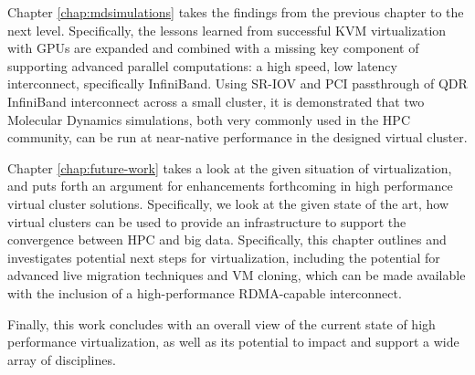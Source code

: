 Chapter \ref{chap:mdsimulations} takes the findings from the previous chapter to the next level. Specifically, the lessons learned from successful KVM virtualization with GPUs are expanded and combined with a missing key component of supporting advanced parallel computations: a high speed, low latency interconnect, specifically InfiniBand. Using SR-IOV and PCI passthrough of QDR InfiniBand interconnect across a small cluster, it is demonstrated that two Molecular Dynamics simulations, both very commonly used in the HPC community, can be run at near-native performance in the designed virtual cluster.

Chapter \ref{chap:future-work} takes a look at the given situation of virtualization, and puts forth an argument for enhancements forthcoming in high performance virtual cluster solutions. Specifically, we look at the given state of the art, how virtual clusters can be used to provide an infrastructure to support the convergence between HPC and big data. Specifically, this chapter outlines and investigates potential next steps for virtualization, including the potential for advanced live migration techniques and VM cloning, which can be made available with the inclusion of a high-performance RDMA-capable interconnect. 

Finally, this work concludes with an overall view of the current state of high performance virtualization, as well as its potential to impact and support a wide array of disciplines. 



